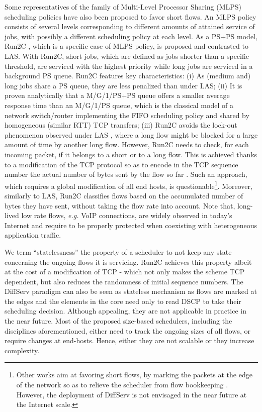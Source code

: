 \documentclass[preprint,12pt]{elsarticle}
\begin{document}
Some representatives of the family of Multi-Level Processor Sharing \linebreak[4] (MLPS) scheduling policies \cite{kleinrock_76_queueing} have also been proposed to favor short flows. An MLPS policy consists of several levels corresponding to different amounts of attained service of jobs, with possibly a different scheduling policy at each level. As a PS+PS model, Run2C \cite{Avrachenkov04Run2c}, which is a specific case of MLPS policy, is proposed and contrasted to LAS. With Run2C, short jobs, which are defined as jobs shorter than a specific threshold, are serviced with the highest priority while long jobs are serviced in a background PS queue. Run2C features key characteristics: (i) As (medium and) long jobs share a PS queue, they are less penalized than under LAS; (ii) It is proven analytically \cite{Avrachenkov04Run2c} that a M/G/1/PS+PS queue offers a smaller average response time than an M/G/1/PS queue, which is the classical model of a network switch/router implementing the FIFO scheduling policy and shared by homogeneous (similar RTT) TCP transfers; (iii) Run2C avoids the lock-out phenomenon observed under LAS \cite{Martin10Lars}, where a long flow might be blocked for a large amount of time by another long flow. However, Run2C needs to check, for each incoming packet, if it belongs to a short or to a long flow. This is achieved thanks to a modification of the TCP protocol so as to encode in the TCP sequence number the actual number of bytes sent by the flow so far \cite{Avrachenkov04Run2c}. Such an approach, which requires a global modification of all end hosts, is questionable\footnote{Other works aim at favoring short flows, by marking the packets at the edge of the network so as to relieve the scheduler from flow bookkeeping \cite{Noureddine02improvingthe}. However, the deployment of DiffServ is not envisaged in the near future at the Internet scale.}. Moreover, similarly to LAS, Run2C classifies flows based on the accumulated number of bytes they have sent, without taking the flow rate into account. Note that, long-lived low rate flows, \textit{e.g.} VoIP connections, are widely observed in today's Internet and require to be properly protected when coexisting with heterogeneous application traffic. 

We term ``statelessness'' the property of a scheduler to not keep any state concerning the ongoing flows it is servicing. Run2C achieves this property albeit at the cost of a modification of TCP -  which not only makes the scheme TCP dependent, but also reduces the randomness of initial sequence numbers. The DiffServ\cite{Noureddine02improvingthe} paradigm can also be seen as stateless mechanism as flows are marked at the edges and the elements in the core need only to read DSCP to take their scheduling decision. Although appealing, they are not applicable in practice in the near future. Most of the proposed size-based schedulers, including the disciplines aforementioned, either need to track the ongoing sizes of all flows, or require changes at end-hosts. Hence, either they are not scalable or they increase complexity. 
\end{document}
